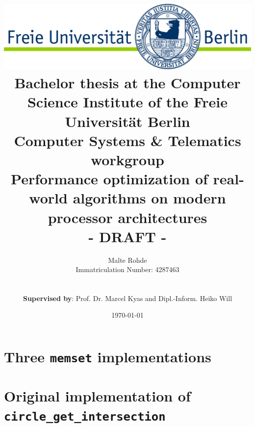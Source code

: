 \documentclass[a4paper,10pt]{article}
\title{\includegraphics[width=1.0\textwidth]{img/fulogo}\\[1.5cm]
{\normalsize Bachelor thesis at the Computer Science Institute of the Freie Universität Berlin\\ Computer Systems \& Telematics workgroup}\\[6ex] {\Huge Performance optimization of real-world algorithms on modern processor architectures\\[1cm]- DRAFT -}\\[6ex]}
\author{Malte Rohde\\
{\normalsize Immatriculation Number: 4287463 }\\
{\normalsize \mailto{malte.rohde@inf.fu-berlin.de}}\\\\
{\normalsize \textbf{Supervised by}: Prof. Dr. Marcel Kyas and Dipl.-Inform. Heiko Will}}
\date{\vspace*{1.0cm} \today{}}
\begin{document}
\begin{titlepage}

\maketitle
\thispagestyle{empty}

\vfill{}

\end{titlepage}

\pagestyle{empty}
\clearpage{}



\tableofcontents
\clearpage{}
\pagestyle{fancy}
\setcounter{page}{1}






\cleardoublepage
{}





\listoffigures
{}
\listoftables
\lstlistoflistings

\clearpage
\begin{appendices}
\section{Three \texttt{memset} implementations}
\label{memset_code}

\section{Original implementation of \texttt{circle\_get\_intersection}}
\label{scalarcircles}

\end{appendices}
\end{document}
